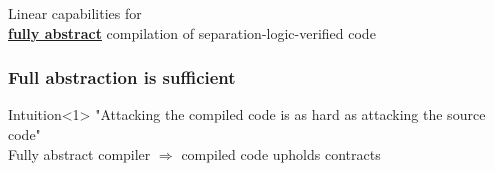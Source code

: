 \documentclass{beamer}
\begin{document}


\begin{frame}[plain,c]
\begin{center}
\Huge Linear capabilities for\\  \textbf{\underline{fully abstract}}
compilation of separation-logic-verified code
\end{center}
\end{frame}

\begin{frame}
\frametitle{Full abstraction is sufficient} %
\begin{block}{Intuition}<1>
"Attacking the compiled code is as hard as attacking the source code" \\[1em]%
Fully abstract compiler $\Rightarrow$ compiled code upholds contracts\\
\end{block}
\end{frame}

\end{document}
